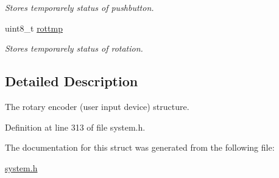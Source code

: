 \begin{CompactItemize}
\begin{CompactList}\small\item\em Stores temporarely status of pushbutton. \item\end{CompactList}\item 
\hypertarget{structrotary__encoder__t_39ea4817ade6d51edfbf0d19cb09eefb}{
uint8\_\-t \hyperlink{structrotary__encoder__t_39ea4817ade6d51edfbf0d19cb09eefb}{rottmp}}
\label{structrotary__encoder__t_39ea4817ade6d51edfbf0d19cb09eefb}

\begin{CompactList}\small\item\em Stores temporarely status of rotation. \item\end{CompactList}\end{CompactItemize}


\subsection{Detailed Description}
The rotary encoder (user input device) structure. 

Definition at line 313 of file system.h.

The documentation for this struct was generated from the following file:\begin{CompactItemize}
\item 
\hyperlink{system_8h}{system.h}\end{CompactItemize}
